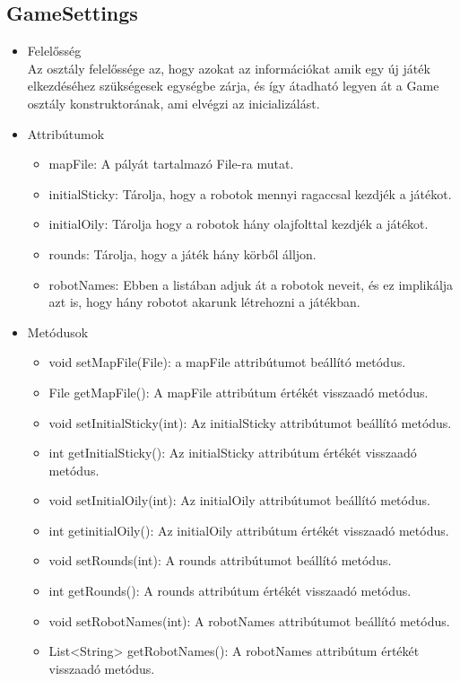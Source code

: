 \subsection{GameSettings}
\begin{itemize}
	\item Felelősség\\
	Az osztály felelőssége az, hogy azokat az információkat amik egy új játék elkezdéséhez szükségesek egységbe zárja, és így átadható legyen át a Game osztály konstruktorának, ami elvégzi az inicializálást.
	\item Attribútumok
	\begin{itemize}
		\item mapFile: A pályát tartalmazó File-ra mutat.
		\item initialSticky: Tárolja, hogy a robotok mennyi ragaccsal kezdjék a játékot.
		\item initialOily: Tárolja hogy a robotok hány olajfolttal kezdjék a játékot.
		\item rounds: Tárolja, hogy a játék hány körből álljon.
		\item robotNames: Ebben a listában adjuk át a robotok neveit, és ez implikálja azt is, hogy hány robotot akarunk létrehozni a játékban.
	\end{itemize}
	\item Metódusok
	\begin{itemize}
		\item void setMapFile(File): a mapFile attribútumot beállító metódus.
		\item File getMapFile(): A mapFile attribútum értékét visszaadó metódus.
		\item void setInitialSticky(int): Az initialSticky attribútumot beállító metódus.
		\item int getInitialSticky(): Az initialSticky attribútum értékét visszaadó metódus.
		\item void setInitialOily(int): Az initialOily attribútumot beállító metódus.
		\item int getinitialOily(): Az initialOily attribútum értékét visszaadó metódus.
		\item void setRounds(int): A rounds attribútumot beállító metódus.
		\item int getRounds(): A rounds attribútum értékét visszaadó metódus.
		\item void setRobotNames(int): A robotNames attribútumot beállító metódus.
		\item List<String> getRobotNames(): A robotNames attribútum értékét visszaadó metódus.
	\end{itemize}
\end{itemize}

